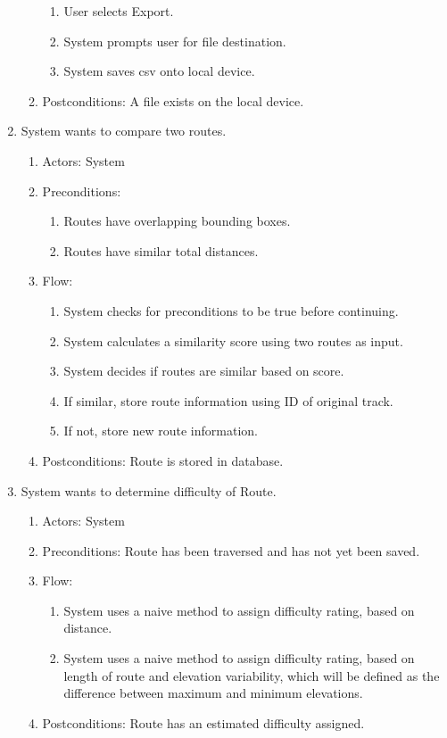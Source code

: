 \documentclass{article}
\begin{document}
\begin{enumerate}
\begin{enumerate}
            \begin{enumerate}
            \item User selects Export.
            \item System prompts user for file destination.
            \item System saves csv onto local device.
            \end{enumerate}
        \item Postconditions: A file exists on the local device.
    \end{enumerate}
\item System wants to compare two routes.
    \begin{enumerate}
        \item Actors: System
        \item Preconditions:
            \begin{enumerate}
            \item Routes have overlapping bounding boxes.
            \item Routes have similar total distances.
            \end{enumerate}
        \item Flow:
            \begin{enumerate}
            \item System checks for preconditions to be true before continuing.
            \item System calculates a similarity score using two routes as input.
            \item System decides if routes are similar based on score.
            \item If similar, store route information using ID of original track.
            \item If not, store new route information.
            \end{enumerate}
        \item Postconditions: Route is stored in database.
    \end{enumerate}
\item System wants to determine difficulty of Route.
    \begin{enumerate}
        \item Actors: System
        \item Preconditions: Route has been traversed and has not yet been saved.
        \item Flow:
            \begin{enumerate}
            \item System uses a naive method to assign difficulty rating, based on distance.
            \item System uses a naive method to assign difficulty rating, based on length of route and elevation variability, which will be defined as the difference between maximum and minimum elevations.
            \end{enumerate}
        \item Postconditions: Route has an estimated difficulty assigned.
    \end{enumerate}
\end{enumerate}
\end{document}
